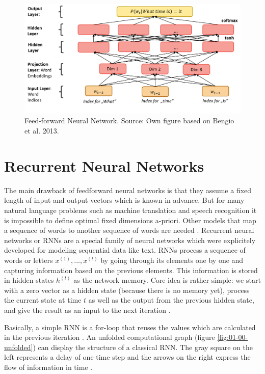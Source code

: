 \documentclass[]{krantz}
\begin{document}
\begin{figure}
\includegraphics[width=1\linewidth]{figures/01-00-deep-learning-for-nlp/01-01_nnlm} \caption{Feed-forward Neural Network. Source: Own figure based on Bengio et al. 2013.}\label{fig:nnlm}
\end{figure}

\hypertarget{recurrent-neural-networks}{%
\section{Recurrent Neural Networks}\label{recurrent-neural-networks}}

The main drawback of feedforward neural networks is that they assume a fixed length of input and output vectors which is known in advance. But for many natural language problems such as machine translation and speech recognition it is impossible to define optimal fixed dimensions a-priori. Other models that map a sequence of words to another sequence of words are needed \citep{sutskever2014sequence}. Recurrent neural networks or RNNs are a special family of neural networks which were explicitely developed for modeling sequential data like text. RNNs process a sequence of words or letters \(x^{(1)}, ..., x^{(t)}\) by going through its elements one by one and capturing information based on the previous elements. This information is stored in hidden states \(h^{(t)}\) as the network memory. Core idea is rather simple: we start with a zero vector as a hidden state (because there is no memory yet), process the current state at time \(t\) as well as the output from the previous hidden state, and give the result as an input to the next iteration \citep{goodfellow2016deep}.

Basically, a simple RNN is a for-loop that reuses the values which are calculated in the previous iteration \citep{chollet2018deep}. An unfolded computational graph (figure \ref{fig:01-00-unfolded}) can display the structure of a classical RNN. The gray square on the left represents a delay of one time step and the arrows on the right express the flow of information in time \citep{goodfellow2016deep}.
\end{document}

